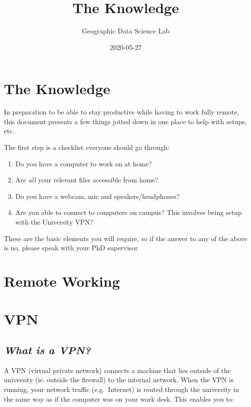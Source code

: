 \documentclass[
]{book}
\title{The Knowledge}
\author{Geographic Data Science Lab}
\date{2020-05-27}
\providecommand{\tightlist}{%
  \setlength{\itemsep}{0pt}\setlength{\parskip}{0pt}}
\begin{document}
\maketitle

{
\setcounter{tocdepth}{1}
\tableofcontents
}
\hypertarget{the-knowledge}{%
\chapter{The Knowledge}\label{the-knowledge}}

In preparation to be able to stay productive while having to work fully remote, this document presents a few things jotted down in one place to help with setups, etc.

The first step is a checklist everyone should go through:

\begin{enumerate}
\def\labelenumi{\arabic{enumi}.}
\tightlist
\item
  Do you have a computer to work on at home?
\item
  Are \emph{all} your relevant files accessible from home?
\item
  Do you have a webcam, mic and speakers/headphones?
\item
  Are you able to connect to computers on campus? This involves being setup with the University VPN?
\end{enumerate}

These are the basic elements you will require, so if the answer to any of the above is no, please speak with your PhD supervisor.

\hypertarget{remote-working}{%
\chapter{Remote Working}\label{remote-working}}

\hypertarget{vpn}{%
\chapter{VPN}\label{vpn}}

\hypertarget{what-is-a-vpn}{%
\section{\texorpdfstring{\emph{What is a VPN?}}{What is a VPN?}}\label{what-is-a-vpn}}

A VPN (virtual private network) connects a machine that lies outside of the university (ie. outside the firewall) to the internal network. When the VPN is running, your network traffic (e.g.~Internet) is routed through the university in the same way as if the computer was on your work desk. This enables you to:
\end{document}
